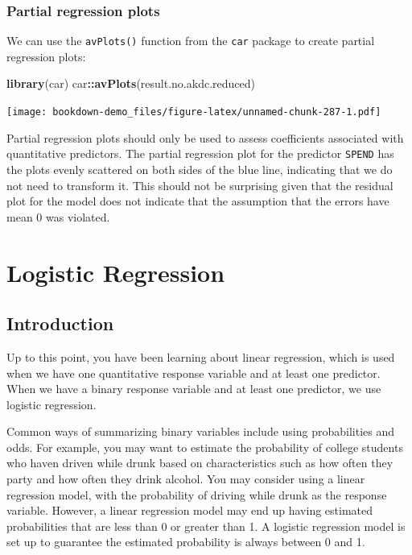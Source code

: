 \documentclass[
]{book}
\newenvironment{Shaded}{\begin{snugshade}}{\end{snugshade}}
\newcommand{\FunctionTok}[1]{\textcolor[rgb]{0.13,0.29,0.53}{\textbf{#1}}}
\newcommand{\NormalTok}[1]{#1}
\newcommand{\SpecialCharTok}[1]{\textcolor[rgb]{0.81,0.36,0.00}{\textbf{#1}}}
\begin{document}
\hypertarget{partial-regression-plots-1}{%
\subsection*{Partial regression plots}\label{partial-regression-plots-1}}

We can use the \texttt{avPlots()} function from the \texttt{car} package to create partial regression plots:

\begin{Shaded}
\begin{Highlighting}[]
\FunctionTok{library}\NormalTok{(car)}
\NormalTok{car}\SpecialCharTok{::}\FunctionTok{avPlots}\NormalTok{(result.no.akdc.reduced)}
\end{Highlighting}
\end{Shaded}

\texttt{[image: bookdown-demo\_files/figure-latex/unnamed-chunk-287-1.pdf]}

Partial regression plots should only be used to assess coefficients associated with quantitative predictors. The partial regression plot for the predictor \texttt{SPEND} has the plots evenly scattered on both sides of the blue line, indicating that we do not need to transform it. This should not be surprising given that the residual plot for the model does not indicate that the assumption that the errors have mean 0 was violated.

\hypertarget{logistic1}{%
\chapter{Logistic Regression}\label{logistic1}}

\hypertarget{introduction-10}{%
\section{Introduction}\label{introduction-10}}

Up to this point, you have been learning about linear regression, which is used when we have one quantitative response variable and at least one predictor. When we have a binary response variable and at least one predictor, we use logistic regression.

Common ways of summarizing binary variables include using probabilities and odds. For example, you may want to estimate the probability of college students who haven driven while drunk based on characteristics such as how often they party and how often they drink alcohol. You may consider using a linear regression model, with the probability of driving while drunk as the response variable. However, a linear regression model may end up having estimated probabilities that are less than 0 or greater than 1. A logistic regression model is set up to guarantee the estimated probability is always between 0 and 1.
\end{document}
